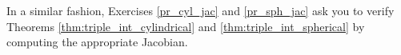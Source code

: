 %
In a similar fashion, %
Exercises \ref{pr_cyl_jac} and \ref{pr_sph_jac}
ask you to verify Theorems \ref{thm:triple_int_cylindrical} and \ref{thm:triple_int_spherical} by computing the appropriate Jacobian.\bigskip

